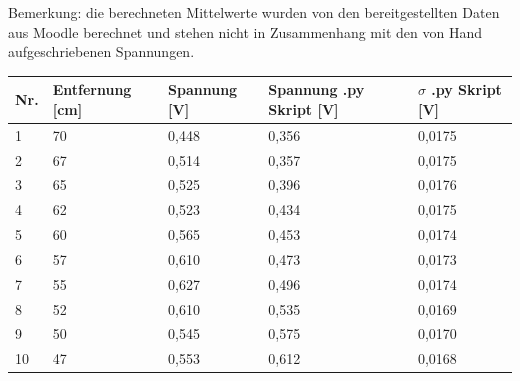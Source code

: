 \documentclass[12pt, oneside, a4paper, \docLanguage]{report}
\begin{document}
Bemerkung: die berechneten Mittelwerte wurden von den bereitgestellten Daten aus Moodle berechnet und stehen nicht in Zusammenhang mit den von Hand aufgeschriebenen Spannungen.
\begin{table}[]
\begin{tabular}{|l|l|l|l|l|}
\hline
\textbf{Nr.} & \textbf{Entfernung {[}cm{]}} & \textbf{Spannung {[}V{]}} & \textbf{Spannung .py Skript {[}V{]}} & \textbf{$\sigma$ .py Skript {[}V{]}} \\ \hline
1            & 70                           & 0,448                     & 0,356                                   & 0,0175                                            \\ \hline
2            & 67                           & 0,514                     & 0,357                                   & 0,0175                                            \\ \hline
3            & 65                           & 0,525                     & 0,396                                   & 0,0176                                            \\ \hline
4            & 62                           & 0,523                     & 0,434                                   & 0,0175                                            \\ \hline
5            & 60                           & 0,565                     & 0,453                                   & 0,0174                                            \\ \hline
6            & 57                           & 0,610                     & 0,473                                   & 0,0173                                            \\ \hline
7            & 55                           & 0,627                     & 0,496                                   & 0,0174                                            \\ \hline
8            & 52                           & 0,610                     & 0,535                                   & 0,0169                                            \\ \hline
9            & 50                           & 0,545                     & 0,575                                   & 0,0170                                            \\ \hline
10           & 47                           & 0,553                     & 0,612                                   & 0,0168                                            \\ \hline

\end{tabular}
\end{table}
\end{document}
